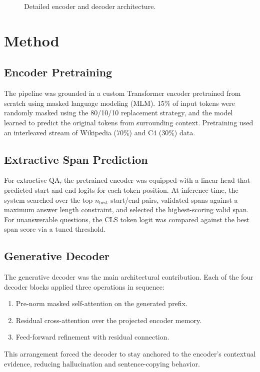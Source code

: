 \documentclass[10pt,twocolumn]{article}
\begin{document}
\begin{figure}[htbp]
\caption{Detailed encoder and decoder architecture.}
\label{fig:encdec}
\end{figure}

\newpage
\section{Method}
\subsection{Encoder Pretraining}
The pipeline was grounded in a custom Transformer encoder pretrained from scratch using masked language modeling (MLM). 15\% of input tokens were randomly masked using the 80/10/10 replacement strategy, and the model learned to predict the original tokens from surrounding context. Pretraining used an interleaved stream of Wikipedia (70\%) and C4 (30\%) data.
\subsection{Extractive Span Prediction}
For extractive QA, the pretrained encoder was equipped with a linear head that predicted start and end logits for each token position. At inference time, the system searched over the top $n_{\text{best}}$ start/end pairs, validated spans against a maximum answer length constraint, and selected the highest-scoring valid span. For unanswerable questions, the CLS token logit was compared against the best span score via a tuned threshold.
\subsection{Generative Decoder}
The generative decoder was the main architectural contribution. Each of the four decoder blocks applied three operations in sequence:
\begin{enumerate}[leftmargin=1.2em,noitemsep,topsep=2pt]
    \item Pre-norm masked self-attention on the generated prefix.
    \item Residual cross-attention over the projected encoder memory.
    \item Feed-forward refinement with residual connection.
\end{enumerate}
This arrangement forced the decoder to stay anchored to the encoder's contextual evidence, reducing hallucination and sentence-copying behavior.
\end{document}
